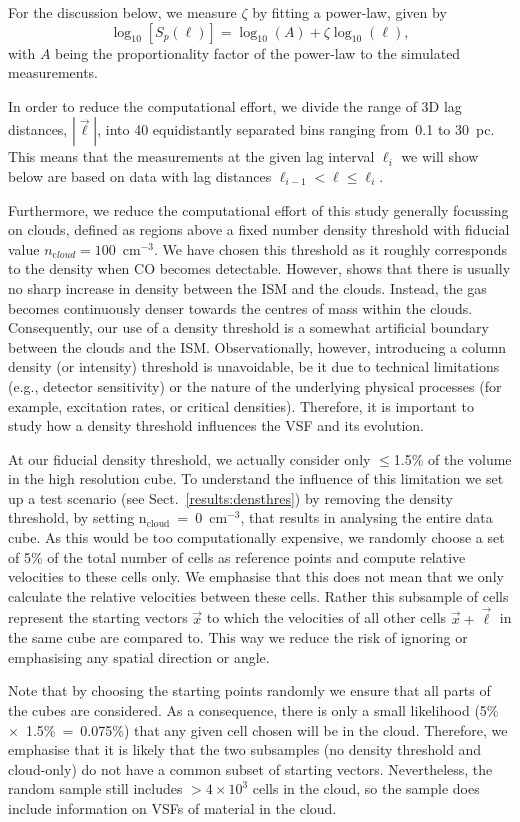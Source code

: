 For the discussion below, we measure $\zeta$ by fitting a power-law,
given by
\begin{equation}
	\log_{10}\left[ S_p(\ell) \right] = \log_{10}\left(A\right) + \zeta \log_{10}(\ell) ,
	\label{equ:method:fitting}
\end{equation}
with $A$ being the proportionality factor of the power-law to the simulated measurements.

In order to reduce the computational effort, we divide the range of 3D lag distances, $|\vec{\ell}|$, into 40 equidistantly separated bins ranging from~0.1 to 30~pc.
This means that the measurements at the given lag interval $\ell_i$ we will show below are based on data with lag distances $\ell_{i-1} < \ell \leq \ell_i$.

Furthermore, we reduce the computational effort of this study generally focussing on clouds, defined as regions above a fixed number density threshold with fiducial value $n_{\mathrm cloud} = 100$~cm$^{-3}$.  We have chosen this threshold as it roughly corresponds to the density when CO becomes detectable.
However,  shows that there is usually no sharp increase in density between the ISM and the clouds. 
Instead, the gas becomes continuously denser towards the centres of mass within the clouds. 
Consequently, our use of a density threshold is a somewhat artificial boundary between the clouds and the ISM. Observationally, however, introducing a column density (or intensity) threshold is unavoidable, be it due to technical limitations (e.g., detector sensitivity) or the nature of the underlying physical processes (for example, excitation rates, or critical densities).
Therefore, it is important to study how a density threshold influences the VSF and its evolution.

At our fiducial density threshold, we actually consider only $\leq$1.5\% of the volume in the high resolution cube.
To understand the influence of this limitation we set up a test scenario (see Sect.~\ref{results:densthres}) by removing the density threshold, by setting n$_\mathrm{cloud}$~=~0~cm$^{-3}$, that results in analysing the entire data cube.
As this would be too computationally expensive, we randomly choose a set of 5\% of the total number of cells as reference points and compute relative velocities to these cells only.
We emphasise that this does not mean that we only calculate the relative velocities between these cells.
Rather this subsample of cells represent the starting vectors $\vec{x}$ to which the velocities of all other cells $\vec{x} + \vec{\ell}$ in the same cube are compared to.
This way we reduce the risk of ignoring or emphasising any spatial direction or angle.

Note that by choosing the starting points randomly we ensure that all parts of the cubes are considered. 
As a consequence, there is only a small likelihood (5\%~$\times$~1.5\%~=~0.075\%) that any given cell chosen will be in the cloud.
Therefore, we emphasise that it is likely that the two subsamples (no density threshold and cloud-only) do not have a common subset of starting vectors.
Nevertheless, the random sample still includes $>4 \times 10^3$ cells in the cloud, so the sample does include information on VSFs of material in the cloud.

\endinput
